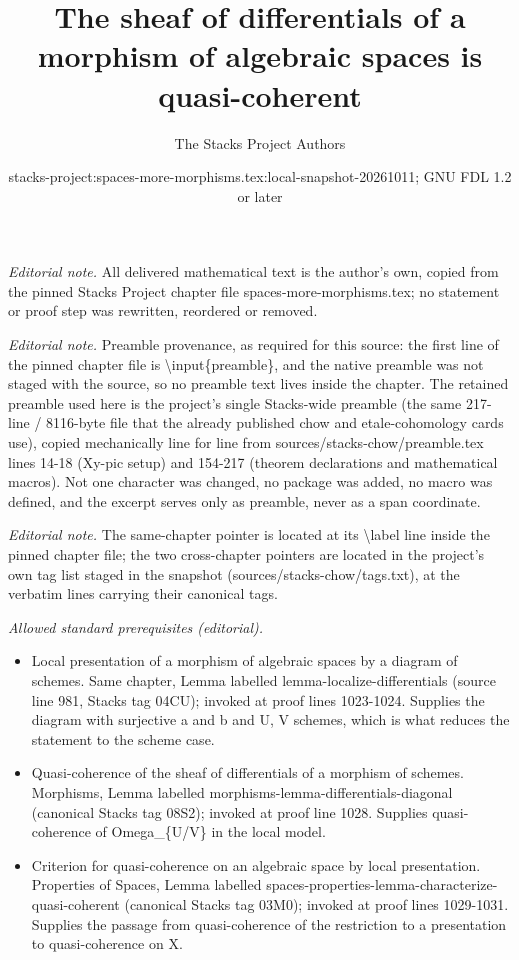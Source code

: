 \documentclass[10pt,a4paper]{amsart}
\title{The sheaf of differentials of a morphism of algebraic spaces is quasi-coherent}
\author{The Stacks Project Authors}
\date{stacks-project:spaces-more-morphisms.tex:local-snapshot-20261011; GNU FDL 1.2 or later}
\theoremstyle{plain}
\theoremstyle{definition}
\theoremstyle{remark}
\numberwithin{equation}{subsection}
\begin{document}
\maketitle
\noindent\textit{Editorial note.} All delivered mathematical text is the author's own, copied from the pinned Stacks Project chapter file spaces-more-morphisms.tex; no statement or proof step was rewritten, reordered or removed.\par\medskip
\noindent\textit{Editorial note.} Preamble provenance, as required for this source: the first line of the pinned chapter file is \textbackslash{}input\{preamble\}, and the native preamble was not staged with the source, so no preamble text lives inside the chapter. The retained preamble used here is the project's single Stacks-wide preamble (the same 217-line / 8116-byte file that the already published chow and etale-cohomology cards use), copied mechanically line for line from sources/stacks-chow/preamble.tex lines 14-18 (Xy-pic setup) and 154-217 (theorem declarations and mathematical macros). Not one character was changed, no package was added, no macro was defined, and the excerpt serves only as preamble, never as a span coordinate.\par\medskip
\noindent\textit{Editorial note.} The same-chapter pointer is located at its \textbackslash{}label line inside the pinned chapter file; the two cross-chapter pointers are located in the project's own tag list staged in the snapshot (sources/stacks-chow/tags.txt), at the verbatim lines carrying their canonical tags.\par\medskip
\noindent\textit{Allowed standard prerequisites (editorial).}\begin{itemize}
\item Local presentation of a morphism of algebraic spaces by a diagram of schemes. Same chapter, Lemma labelled lemma-localize-differentials (source line 981, Stacks tag 04CU); invoked at proof lines 1023-1024. Supplies the diagram with surjective a and b and U, V schemes, which is what reduces the statement to the scheme case.
\item Quasi-coherence of the sheaf of differentials of a morphism of schemes. Morphisms, Lemma labelled morphisms-lemma-differentials-diagonal (canonical Stacks tag 08S2); invoked at proof line 1028. Supplies quasi-coherence of Omega\_\{U/V\} in the local model.
\item Criterion for quasi-coherence on an algebraic space by local presentation. Properties of Spaces, Lemma labelled spaces-properties-lemma-characterize-quasi-coherent (canonical Stacks tag 03M0); invoked at proof lines 1029-1031. Supplies the passage from quasi-coherence of the restriction to a presentation to quasi-coherence on X.
\end{itemize}\medskip
\end{document}
